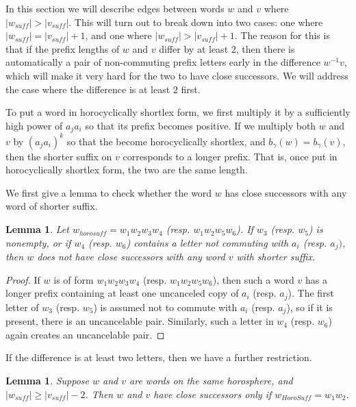 \documentclass[10pt,a4paper]{amsart}
\newtheorem{lemma}[theorem]{Lemma}
\theoremstyle{definition}
\theoremstyle{remark}
\begin{document}
	In this section we will describe edges between words $w$ and $v$  where $|w_{suff}|>|v_{suff}|$. This will turn out to break down into two cases: one where $|w_{suff}|=|v_{suff}|+1$, and one where $|w_{suff}|>|v_{suff}|+1$. The reason for this is that if the prefix lengths of $w$ and $v$ differ by at least $2$, then there is automatically a pair of non-commuting prefix letters early in the difference $w^{-1}v$, which will make it very hard for the two to have close successors. We will address the case where the difference is at least $2$ first. 
	
	To put a word in horocyclically shortlex form, we first multiply it by a sufficiently high power of $a_ja_i$ so that its prefix becomes positive. If we multiply both $w$ and $v$ by $(a_ja_i)^k$ so that the become horocyclically shortlex, and $b_\gamma(w)=b_\gamma(v)$, then the shorter suffix on $v$ corresponds to a longer prefix. That is, once put in horocyclically shortlex form, the two are the same length.
	
	We first give a lemma to check whether the word $w$ has close successors with any word of shorter suffix.
	
	\begin{lemma}
		
		Let $w_{horosuff} = w_1w_2w_3w_4$ (resp. $w_1w_2w_5w_6$). If $w_3$ (resp. $w_5$) is nonempty, or if $w_4$ (resp. $w_6$) contains a letter not commuting with $a_i$ (resp. $a_j)$, then $w$ does not have close successors with any word $v$ with shorter suffix.
		
	\end{lemma}
	
	\begin{proof}
		
		If $w$ is of form $w_1w_2w_3w_4$ (resp. $w_1w_2w_5w_6$), then such a word $v$ has a longer prefix containing at least one uncanceled copy of $a_i$ (resp. $a_j$). The first letter of $w_3$ (resp. $w_5$) is assumed not to commute with $a_i$ (resp. $a_j$), so if it is present, there is an uncancelable pair. Similarly, such a letter in $w_4$ (resp. $w_6$) again creates an uncancelable pair. 	
	\end{proof}
	
	If the difference is at least two letters, then we have a further restriction.
	
	\begin{lemma}
		
		Suppose $w$ and $v$ are words on the same horosphere, and \newline $|w_{suff}|\ge |v_{suff}|-2$. Then $w$ and $v$ have close successors only if $w_{HoroSuff}=w_1w_2$.
		
	\end{lemma}
	
\end{document}
